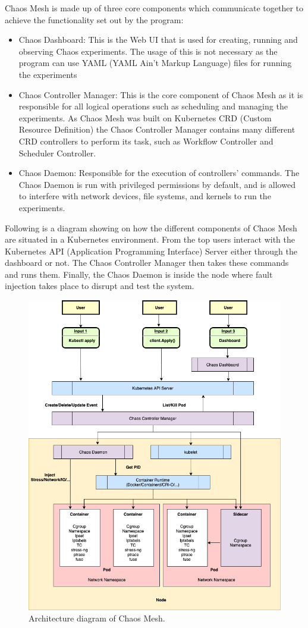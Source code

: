 \documentclass[conference]{IEEEtran}
\begin{document}
Chaos Mesh is made up of three core components which communicate together to achieve the functionality set out by the program:
\begin{itemize}
	\item Chaos Dashboard: This is the Web UI that is used for creating, running and observing Chaos experiments. The usage of this is not necessary as the program can use YAML (YAML Ain't Markup Language) files for running the experiments
	\item Chaos Controller Manager: This is the core component of Chaos Mesh as it is responsible for all logical operations such as scheduling and managing the experiments. As Chaos Mesh was built on Kubernetes CRD (Custom Resource Definition) the Chaos Controller Manager contains many different CRD controllers to perform its task, such as Workflow Controller and Scheduler Controller.
	\item Chaos Daemon: Responsible for the execution of controllers' commands. The Chaos Daemon is run with privileged permissions by default, and is allowed to interfere with network devices, file systems, and kernels to run the experiments.
\end{itemize}

Following is a diagram showing on how the different components of Chaos Mesh are situated in a Kubernetes environment. From the top users interact with the Kubernetes API (Application Programming Interface) Server either through the dashboard or not. The Chaos Controller Manager then takes these commands and runs them. Finally, the Chaos Daemon is inside the node where fault injection takes place to disrupt and test the system.

\begin{figure}
	\centering
	\includegraphics[width=0.71\linewidth]{chaos_mesh_diagram}
	\caption{Architecture diagram of Chaos Mesh.}
	\label{fig:chaosmeshdiagram}
\end{figure}
\end{document}
